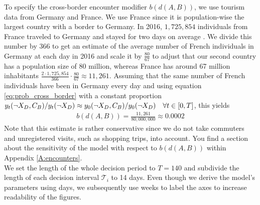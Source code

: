 To specify the cross-border encounter modifier $b(d(A,B))$, we use tourism data from Germany and France. We use France since it is population-wise the largest country with a border to Germany. In 2016, $1,725,854$ individuals from France traveled to Germany and stayed for two days on average \citep{SBA.2017}. We divide this number by 366 to get an estimate of the average number of French individuals in Germany at each day in 2016 and scale it by $\frac{80}{67}$ to adjust that our second country has a population size of 80 million, whereas France has around 67 million inhabitants $\frac{2 \cdot 1,725,854}{366} \cdot \frac{80}{67
} \approx 11,261$. Assuming that the same number of French individuals have been in Germany every day and using equation \eqref{eq:prob_cross_border} with a constant proportion $y_t(\neg X_D, C_B) / y_t(\neg X_D) \approx y_0(\neg X_D, C_B) / y_0(\neg X_D) \quad \forall t \in [0,T]$, this yields 
\begin{align*}
b(d(A, B)) = \frac{11,261}{80,000,000} \approx 0.0002
\end{align*}
Note that this estimate is rather conservative since we do not take commuters and unregistered visits, such as shopping trips, into account. You find a section about the sensitivity of the model with respect to $b(d(A, B))$ within Appendix \ref{A:encounters}. \\

We set the length of the whole decision period to $T=140$ and subdivide the length of each decision interval $\mathcal{T}_i$ to 14 days. Even though we derive the model's parameters using days, we subsequently use weeks to label the axes to increase readability of the figures.

